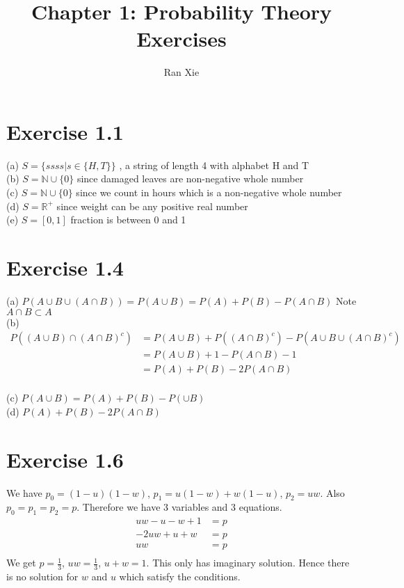 \documentclass[12pt]{article}
\title{Chapter 1: Probability Theory Exercises}
\author{Ran Xie}
\begin{document}
\maketitle

\section*{Exercise 1.1}
(a) $S=\{ ssss | s \in \{H, T\} \}$ , a string of length 4 with alphabet H and T \\

(b) $S=\mathbb{N}\cup\{0\}$ since damaged leaves are non-negative whole number\\

(c) $S=\mathbb{N}\cup\{0\}$ since we count in hours which is a non-negative whole number \\

(d) $S=\mathbb{R}^+$ since weight can be any positive real number \\

(e) $S= [0,1]$ fraction is between 0 and 1 \\

\section*{Exercise 1.4}
(a) $P(A\cup B \cup(A \cap B)) = P(A \cup B) = P(A) + P(B) - P(A \cap B)$  Note $A\cap B \subset A$ \\

(b) $$\begin{aligned}
P((A \cup B)\cap (A \cap B)^c) &= P(A\cup B) + P((A \cap B)^c) - P(A\cup B \cup (A \cap B)^c) \\
&= P(A\cup B) + 1 - P(A \cap B) - 1 \\
&= P(A) + P(B) - 2P(A\cap B) \\
\end{aligned}$$

(c) $P(A\cup B) = P(A) + P(B) - P(\cup B)$ \\

(d) $P(A) + P(B) - 2P(A\cap B)$ \\

\section*{Exercise 1.6}
We have $p_0 = (1-u)(1-w)$, $p_1 = u(1-w) + w(1-u)$, $p_2 = uw$. Also $p_0=p_1=p_2 = p$. Therefore we have 3 variables and 3 equations. 
$$\begin{aligned}
  uw - u - w + 1 &= p \\
  -2uw + u + w &= p \\
  uw &= p \\
\end{aligned}
$$
We get $p=\frac{1}{3}$, $uw = \frac{1}{3}$, $u + w = 1$. This only has imaginary solution. Hence there is no solution for $w$ and $u$ which satisfy the conditions.
\end{document}
